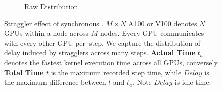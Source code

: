 \begin{figure}[!h]
\begin{subfigure}{0.4\textwidth}
        \caption{Raw Distribution}
        \label{sub:raw_az}
    \end{subfigure}
    \caption{Straggler effect of synchronous \alltoall. $M\times N$ A100 or V100 denotes
        $N$ GPUs within a node across $M$ nodes.
        Every GPU communicates with every other GPU per~\alltoall step.
        We capture the distribution of delay induced by stragglers across many steps.
        \textbf{Actual Time} $t_a$ denotes the fastest kernel execution time across all GPUs,
        conversely \textbf{Total Time} $t$ is the maximum recorded step time, while
        $Delay$ is the maximum difference between $t$ and $t_a$. Note $Delay$ is idle time.}
    \label{fig:straggler}
\end{figure}